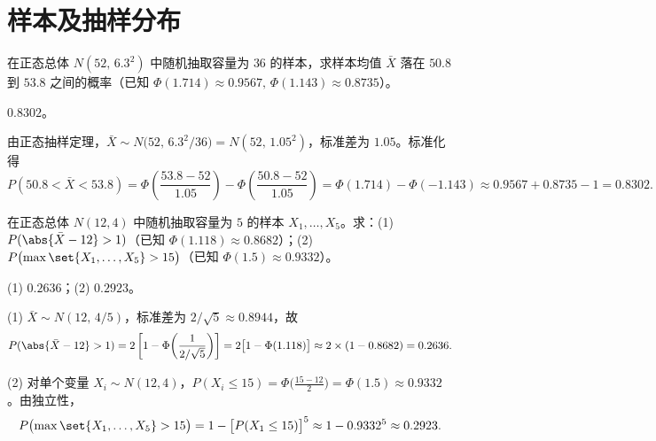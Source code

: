 %
%
\section{样本及抽样分布}

\begin{exercise}
在正态总体 $N(52,\,6.3^2)$ 中随机抽取容量为 $36$ 的样本，求样本均值 $\bar{X}$ 落在 $50.8$ 到 $53.8$ 之间的概率（已知 $\Phi(1.714)\approx 0.9567,\,\Phi(1.143)\approx 0.8735$）。
\begin{answer}
$0.8302$。
\end{answer}
\begin{solution}
由正态抽样定理，$\bar{X}\sim N\bigl(52,\,6.3^2/36\bigr)=N(52,\,1.05^2)$，标准差为 $1.05$。标准化得
\[
  P(50.8<\bar{X}<53.8)
  =\Phi\!\left(\frac{53.8-52}{1.05}\right)-\Phi\!\left(\frac{50.8-52}{1.05}\right)
  =\Phi(1.714)-\Phi(-1.143)
  \approx 0.9567+0.8735-1=0.8302.
\]
\end{solution}
\end{exercise}

\begin{exercise}
在正态总体 $N(12,4)$ 中随机抽取容量为 $5$ 的样本 $X_1,\ldots,X_5$。求：(1) $P(\abs{\bar{X}-12}>1)$（已知 $\Phi(1.118)\approx 0.8682$）；(2) $P\bigl(\max\set{X_1,\ldots,X_5}>15\bigr)$（已知 $\Phi(1.5)\approx 0.9332$）。
\begin{answer}
(1) $0.2636$；(2) $0.2923$。
\end{answer}
\begin{solution}
(1) $\bar{X}\sim N(12,\,4/5)$，标准差为 $2/\sqrt{5}\approx 0.8944$，故
\[
  P(\abs{\bar{X}-12}>1)=2\left[1-\Phi\!\left(\frac{1}{2/\sqrt{5}}\right)\right]
  =2\bigl[1-\Phi(1.118)\bigr]\approx 2\times(1-0.8682)=0.2636.
\]

(2) 对单个变量 $X_i\sim N(12,4)$，$P(X_i\le 15)=\Phi\bigl(\frac{15-12}{2}\bigr)=\Phi(1.5)\approx 0.9332$。由独立性，
\[
  P\bigl(\max\set{X_1,\ldots,X_5}>15\bigr)=1-\bigl[P(X_1\le 15)\bigr]^5
  \approx 1-0.9332^5\approx 0.2923.
\]
\end{solution}
\end{exercise}


